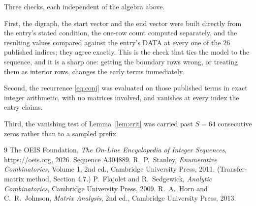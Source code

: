 \documentclass[11pt,a4paper]{article}
\theoremstyle{plain}
\theoremstyle{definition}
\begin{document}
Three checks, each independent of the algebra above.

First, the digraph, the start vector and the end vector were built directly from the
entry's stated condition, the one-row count computed separately, and the resulting values
compared against the entry's DATA at every one of the $26$ published indices; they
agree exactly. This is the check that ties the model to the sequence, and it is a sharp one:
getting the boundary rows wrong, or treating them as interior rows, changes the early terms
immediately.

Second, the recurrence \eqref{eq:conj} was evaluated on those published terms in exact
integer arithmetic, with no matrices involved, and vanishes at every index the entry claims.

Third, the vanishing test of Lemma~\ref{lem:crit} was carried past $S=64$ consecutive
zeros rather than to a sampled prefix.

\begin{thebibliography}{9}
 The OEIS Foundation, \emph{The On-Line Encyclopedia of Integer
Sequences}, \url{https://oeis.org}, 2026. Sequence A304889.
 R.~P.~Stanley, \emph{Enumerative Combinatorics}, Volume 1, 2nd ed.,
Cambridge University Press, 2011. (Transfer-matrix method, Section 4.7.)
 P.~Flajolet and R.~Sedgewick, \emph{Analytic Combinatorics}, Cambridge
University Press, 2009.
 R.~A.~Horn and C.~R.~Johnson, \emph{Matrix Analysis}, 2nd ed., Cambridge
University Press, 2013.
\end{thebibliography}
\end{document}
